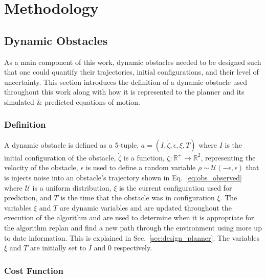 


\chapter{Methodology}

\label{chapter:methodology}

\section{Dynamic Obstacles}

As a main component of this work, dynamic obstacles needed to be designed such
that one could quantify their trajectories, initial configurations, and their
level of uncertainty. This section introduces the definition of a dynamic
obstacle used throughout this work along with how it is represented to the
planner and its simulated \& predicted equations of motion.

\subsection{Definition}

A dynamic obstacle is defined as a 5-tuple, $a = (I, \dot{\zeta},
\epsilon, \xi, T)$ where $I$ is the initial configuration of the obstacle,
$\dot{\zeta}$ is a function, $\dot{\zeta}: \mathbb{R}^+ \rightarrow
\mathbb{R}^2$, representing the velocity of the obstacle, $\epsilon$ is used to
define a random variable $\rho \sim \mathcal{U}(-\epsilon, \epsilon)$ that is
injects noise into an obstacle's trajectory shown in Eq.~\ref{eq:obs_observed}
where $\mathcal{U}$ is a uniform distribution, $\xi$ is the current
configuration used for prediction, and $T$ is the time that the obstacle was in
configuration $\xi$.  The variables $\xi$ and $T$ are dynamic variables and are
updated throughout the execution of the algorithm and are used to determine
when it is appropriate for the algorithm replan and find a new path through the
environment using more up to date information. This is explained in
Sec.~\ref{sec:design_planner}. The variables $\xi$ and $T$ are initially set to
$I$ and $0$ respectively.

\subsection{Cost Function}

\label{sec:cost}

